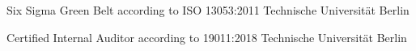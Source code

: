 

\begin{cventries}

  \cventry
    {Six Sigma Green Belt according to ISO 13053:2011} %
    {} %
    {Technische Universität Berlin} %
    {} %
    {}

  \cventry
    {Certified Internal Auditor according to 19011:2018} %
    {} %
    {Technische Universität Berlin} %
    {} %
    {}

\end{cventries}
